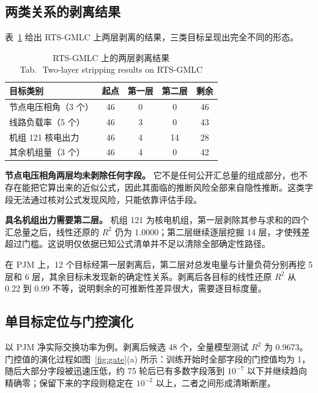 \documentclass[UTF8,zihao=5,twoside]{ctexart}
\newcommand{\tabbicaption}[2]{\caption{#1\\[-0.2em]\small Tab.\,\thetable\ #2}}
\begin{document}
\subsection{两类关系的剥离结果}

表~\ref{tab:strip} 给出 RTS-GMLC 上两层剥离的结果，三类目标呈现出完全不同的形态。

\begin{table}[!tbp]
\centering
\tabbicaption{RTS-GMLC 上的两层剥离结果}{Two-layer stripping results on RTS-GMLC}
\label{tab:strip}
\setlength{\tabcolsep}{3.5pt}
\begin{tabular}{lcccc}
\toprule
目标类别 & 起点 & 第一层 & 第二层 & 剩余 \\
\midrule
节点电压相角（3 个） & 46 & 0 & 0 & 46 \\
线路负载率（5 个） & 46 & 3 & 0 & 43 \\
机组 121 核电出力 & 46 & 4 & 14 & 28 \\
其余机组量（3 个） & 46 & 4 & 0 & 42 \\
\bottomrule
\end{tabular}
\end{table}

\textbf{节点电压相角两层均未剥除任何字段。} 它不是任何公开汇总量的组成部分，也不存在能把它算出来的近似公式，因此其面临的推断风险全部来自隐性推断。这类字段无法通过核对公式发现风险，只能依靠评估手段。

\textbf{具名机组出力需要第二层。} 机组 121 为核电机组，第一层剥除其参与求和的四个汇总量之后，线性还原的 $R^2$ 仍为 1.0000；第二层继续逐层挖掘 14 层，才使残差超过门槛。这说明仅依据已知公式清单并不足以清除全部确定性路径。

在 PJM 上，12 个目标经第一层剥离后，第二层对总发电量与计量负荷分别再挖 5 层和 6 层，其余目标未发现新的确定性关系。剥离后各目标的线性还原 $R^2$ 从 0.22 到 0.99 不等，说明剩余的可推断性差异很大，需要逐目标度量。

\subsection{单目标定位与门控演化}

以 PJM 净实际交换功率为例。剥离后候选 48 个，全量模型测试 $R^2$ 为 0.9673。门控值的演化过程如图~\ref{fig:gate}(a) 所示：训练开始时全部字段的门控值均为 1，随后大部分字段被迅速压低，约 75 轮后已有多数字段落到 $10^{-7}$ 以下并继续趋向精确零；保留下来的字段则稳定在 $10^{-2}$ 以上，二者之间形成清晰断崖。
\end{document}
